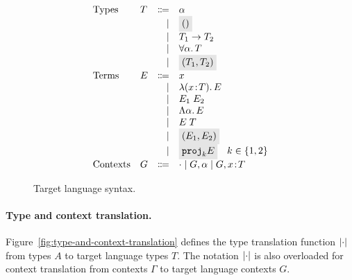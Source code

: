 \begin{figure}[h]
  \[
    \begin{array}{llrl}
      \text{Types}    & T & \Coloneqq & \alpha \\
                      &   & \mid      & \highlight {$ () $} \\
                      &   & \mid      & {T_1} \to {T_2} \\
                      &   & \mid      & \for \alpha T \\
                      &   & \mid      & \highlight {$ \pair {T_1} {T_2} $} \\
      \text{Terms}    & E & \Coloneqq & x \\
                      &   & \mid      & \lamty x T E \\
                      &   & \mid      & \app {E_1} {E_2} \\
                      &   & \mid      & \blam \alpha E \\
                      &   & \mid      & \tapp E T \\
                      &   & \mid      & \highlight {$ \pair {E_1} {E_2} $} \\
                      &   & \mid      & \highlight {$ \proj k E $} \quad k \in \{ 1, 2 \} \\
      \text{Contexts} & G & \Coloneqq & \cdot \mid G, \alpha \mid G, x \oftype T \\
    \end{array}
  \]
  \caption{Target language syntax.}
  \label{fig:f-syntax}
\end{figure}

\paragraph{Type and context translation.}

Figure~\ref{fig:type-and-context-translation} defines the type translation
function $\lvert \cdot \rvert$ from \name types $A$ to target language types $T$. The
notation $\lvert \cdot \rvert$ is also overloaded for context translation from \name
contexts $\Gamma$ to target language contexts $G$.

